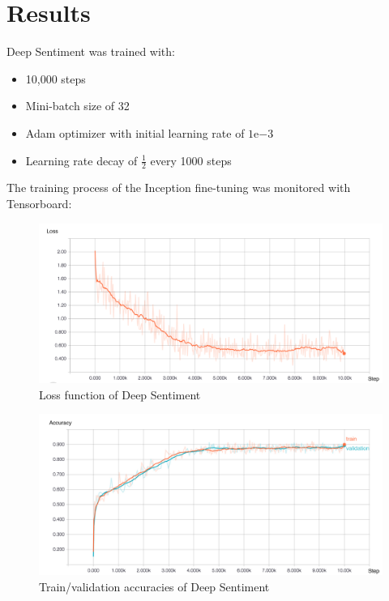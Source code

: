 \section{Results}
Deep Sentiment was trained with:
\begin{itemize}[topsep=0pt]
    \itemsep-1em
    \item 10,000 steps
    \item Mini-batch size of 32
    \item Adam optimizer with initial learning rate of $1\mathrm{e}{-3}$
    \item Learning rate decay of $\frac{1}{2}$ every 1000 steps
\end{itemize}

The training process of the Inception fine-tuning was monitored with Tensorboard:
\begin{figure}[H]
    \centering
    \includegraphics[width=\textwidth]{Images/image_text_model_loss_cleaned.jpg}
    \caption{Loss function of Deep Sentiment}
\end{figure}

\begin{figure}[H]
    \centering
    \includegraphics[width=\textwidth]{Images/image_text_model_accuracies_cleaned.jpg}
    \caption{Train/validation accuracies of Deep Sentiment}
\end{figure}

